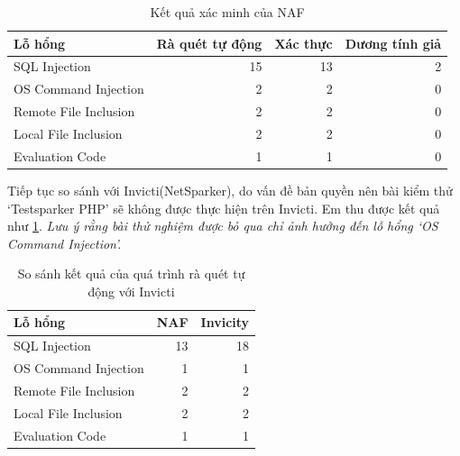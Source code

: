 \documentclass[./../main.tex]{subfiles}
\begin{document}
\begin{table}[ht!]
	\begin{tabular}{|l|r|r|r|}
		\hline
		\textbf{Lỗ hổng}      & \multicolumn{1}{l|}{\textbf{Rà quét tự động}} & \multicolumn{1}{l|}{\textbf{Xác thực}} & \multicolumn{1}{l|}{\textbf{Dương tính giả}} \\ \hline
		SQL Injection         & 15                                            & 13                                     & 2                                            \\ \hline
		OS Command Injection  & 2                                             & 2                                      & 0                                            \\ \hline
		Remote File Inclusion & 2                                             & 2                                      & 0                                            \\ \hline
		Local File Inclusion  & 2                                             & 2                                      & 0                                            \\ \hline
		Evaluation Code       & 1                                             & 1                                      & 0                                            \\ \hline
	\end{tabular}
	\caption{Kết quả xác minh của NAF}
\end{table}

Tiếp tục so sánh với Invicti(NetSparker), do vấn đề bản quyền nên bài kiểm thử `Testsparker PHP' sẽ không được thực hiện trên Invicti. Em thu được kết quả như \ref{tb:diff}. \textit{Lưu ý rằng bài thử nghiệm được bỏ qua chỉ ảnh hưởng đến lỗ hổng `OS Command Injection'.}

\begin{table}[ht!]
	\begin{tabular}{|l|r|r|}
		\hline
		\textbf{Lỗ hổng}      & \multicolumn{1}{l|}{\textbf{NAF}} & \multicolumn{1}{l|}{\textbf{Invicity}} \\ \hline
		SQL Injection         & 13                                & 18                                     \\ \hline
		OS Command Injection  & 1                                 & 1                                      \\ \hline
		Remote File Inclusion & 2                                 & 2                                      \\ \hline
		Local File Inclusion  & 2                                 & 2                                      \\ \hline
		Evaluation Code       & 1                                 & 1                                      \\ \hline
	\end{tabular}
	\caption{So sánh kết quả của quá trình rà quét tự động với Invicti}
	\label{tb:diff}
\end{table}
\end{document}
